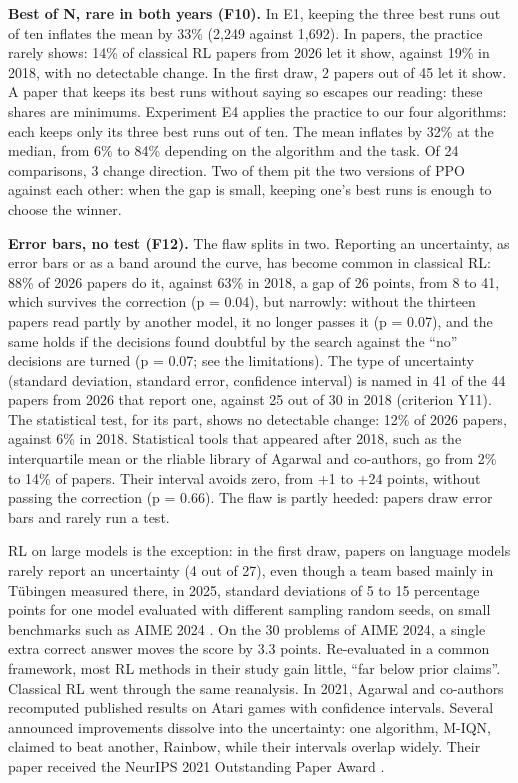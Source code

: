 \documentclass[11pt,a4paper]{article}
\begin{document}
\textbf{Best of N, rare in both years (F10).} In E1, keeping the three
best runs out of ten inflates the mean by 33\% (2,249 against 1,692). In
papers, the practice rarely shows: 14\% of classical RL papers from 2026
let it show, against 19\% in 2018, with no detectable change. In the
first draw, 2 papers out of 45 let it show. A paper that keeps its best
runs without saying so escapes our reading: these shares are minimums.
Experiment E4 applies the practice to our four algorithms: each keeps
only its three best runs out of ten. The mean inflates by 32\% at the
median, from 6\% to 84\% depending on the algorithm and the task. Of 24
comparisons, 3 change direction. Two of them pit the two versions of PPO
against each other: when the gap is small, keeping one's best runs is
enough to choose the winner.

\textbf{Error bars, no test (F12).} The flaw splits in two. Reporting an
uncertainty, as error bars or as a band around the curve, has become
common in classical RL: 88\% of 2026 papers do it, against 63\% in 2018,
a gap of 26 points, from 8 to 41, which survives the correction (p =
0.04), but narrowly: without the thirteen papers read partly by another
model, it no longer passes it (p = 0.07), and the same holds if the
decisions found doubtful by the search against the ``no'' decisions are
turned (p = 0.07; see the limitations). The type of uncertainty
(standard deviation, standard error, confidence interval) is named in 41
of the 44 papers from 2026 that report one, against 25 out of 30 in 2018
(criterion Y11). The statistical test, for its part, shows no detectable
change: 12\% of 2026 papers, against 6\% in 2018. Statistical tools that
appeared after 2018, such as the interquartile mean or the rliable
library of Agarwal and co-authors, go from 2\% to 14\% of papers. Their
interval avoids zero, from +1 to +24 points, without passing the
correction (p = 0.66). The flaw is partly heeded: papers draw error bars
and rarely run a test.

RL on large models is the exception: in the first draw, papers on
language models rarely report an uncertainty (4 out of 27), even though
a team based mainly in Tübingen measured there, in 2025, standard
deviations of 5 to 15 percentage points for one model evaluated with
different sampling random seeds, on small benchmarks such as AIME 2024
\autocite{hochlehnert2025sober}. On the 30 problems of AIME 2024, a
single extra correct answer moves the score by 3.3 points. Re-evaluated
in a common framework, most RL methods in their study gain little, ``far
below prior claims''. Classical RL went through the same reanalysis. In
2021, Agarwal and co-authors recomputed published results on Atari games
with confidence intervals. Several announced improvements dissolve into
the uncertainty: one algorithm, M-IQN, claimed to beat another, Rainbow,
while their intervals overlap widely. Their paper received the NeurIPS
2021 Outstanding Paper Award \autocite{agarwal2021precipice}.
\end{document}
